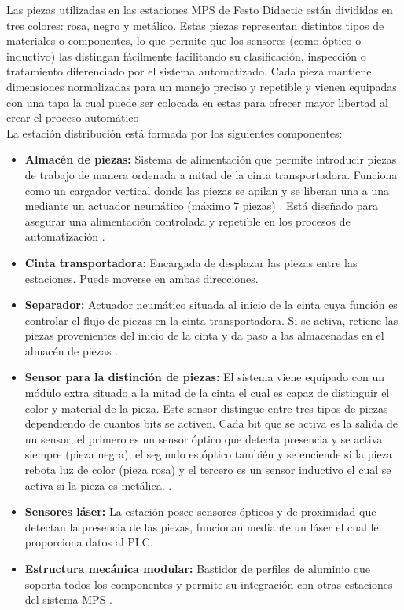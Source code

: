 Las piezas utilizadas en las estaciones MPS de Festo Didactic están divididas en tres colores: rosa, negro y metálico. Estas piezas representan distintos tipos de materiales o componentes, lo que permite que los sensores (como óptico o inductivo) las distingan fácilmente facilitando su clasificación, inspección o tratamiento diferenciado por el sistema automatizado. Cada pieza mantiene dimensiones normalizadas para un manejo preciso y repetible y vienen equipadas con una tapa la cual puede ser colocada en estas para ofrecer mayor libertad al crear el proceso automático \\

La estación distribución está formada por los siguientes componentes:

\begin{itemize}
   \item \textbf{Almacén de piezas:} Sistema de alimentación que permite introducir piezas de trabajo de manera ordenada a mitad de la cinta transportadora. Funciona como un cargador vertical donde las piezas se apilan y se liberan una a una mediante un actuador neumático (máximo 7 piezas) \cite{estacion_distribucion}. Está diseñado para asegurar una alimentación controlada y repetible en los procesos de automatización \cite{estacion_distribucion}.
   
    \item \textbf{Cinta transportadora:} Encargada de desplazar las piezas entre las estaciones. Puede moverse en ambas direcciones. 
    
     \item \textbf{Separador:} Actuador neumático situada al inicio de la cinta cuya función es controlar el flujo de piezas en la cinta transportadora. Si se activa, retiene las piezas provenientes del inicio de la cinta y da paso a las almacenadas en el almacén de piezas \cite{estacion_distribucion}.
     
      \item \textbf{Sensor para la distinción de piezas:} El sistema viene equipado con un módulo extra situado a la mitad de la cinta el cual es capaz de distinguir el color y material de la pieza. Este sensor distingue entre tres tipos de piezas dependiendo de cuantos bits se activen. Cada bit que se activa es la salida de un sensor, el primero es un sensor óptico que detecta presencia y se activa siempre (pieza negra), el segundo es óptico también y se enciende si la pieza rebota luz de color (pieza rosa) y el tercero es un sensor inductivo el cual se activa si la pieza es metálica. \cite{estacion_distribucion}.

    \item \textbf{Sensores láser:} La estación posee sensores ópticos y de proximidad que detectan la presencia de las piezas, funcionan mediante un láser el cual le proporciona datos al PLC.

    \item \textbf{Estructura mecánica modular:} Bastidor de perfiles de aluminio que soporta todos los componentes y permite su integración con otras estaciones del sistema MPS \cite{estacion_distribucion}.
\end{itemize}

